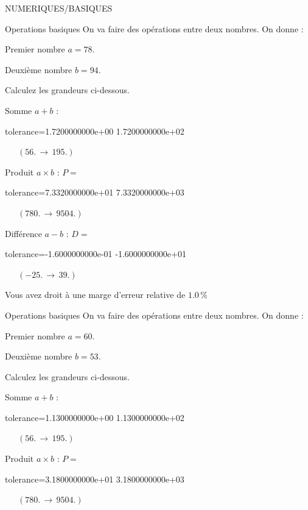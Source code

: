 \documentclass[12pt]{article}
\begin{document}
\begin{quiz}{NUMERIQUES/BASIQUES} 

 \begin{cloze}{Operations basiques} 
On va faire des opérations entre deux nombres. On donne :

Premier nombre $a = 78.\, $

Deuxième nombre $b = 94.\, $

 

Calculez les grandeurs ci-dessous.

Somme $ a + b $ : 
\begin{numerical}[points=1] 
\item[tolerance={1.7200000000e+00}] 1.7200000000e+02 
\end{numerical} 
 $\,$ 
 $ \quad (56. \, \rightarrow \, 195.) $ 

Produit $ a \times b $ : $P =  $
\begin{numerical}[points=1] 
\item[tolerance={7.3320000000e+01}] 7.3320000000e+03 
\end{numerical} 
 $\,$ 
 $ \quad (780. \, \rightarrow \, 9504.) $ 

Différence $ a - b $ : $D =  $
\begin{numerical}[points=1] 
\item[tolerance={-1.6000000000e-01}] -1.6000000000e+01 
\end{numerical} 
 $\,$ 
 $ \quad (-25. \, \rightarrow \, 39.) $ 

Vous avez droit à une marge d'erreur relative de $1.0\, \% $

\end{cloze} 


 \begin{cloze}{Operations basiques} 
On va faire des opérations entre deux nombres. On donne :

Premier nombre $a = 60.\, $

Deuxième nombre $b = 53.\, $

 

Calculez les grandeurs ci-dessous.

Somme $ a + b $ : 
\begin{numerical}[points=1] 
\item[tolerance={1.1300000000e+00}] 1.1300000000e+02 
\end{numerical} 
 $\,$ 
 $ \quad (56. \, \rightarrow \, 195.) $ 

Produit $ a \times b $ : $P =  $
\begin{numerical}[points=1] 
\item[tolerance={3.1800000000e+01}] 3.1800000000e+03 
\end{numerical} 
 $\,$ 
 $ \quad (780. \, \rightarrow \, 9504.) $ 


\end{cloze}
\end{quiz}
\end{document}

